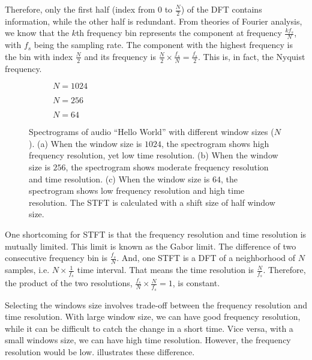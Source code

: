 \documentclass[12pt,final,twoside]{report}
\begin{document}
Therefore, only the first half (index from $0$ to $\frac{N}{2}$) of the DFT contains information, while the other half is redundant. From theories of Fourier analysis, we know that the $k$th frequency bin represents the component at frequency $\frac{kf_s}{N}$, with $f_s$ being the sampling rate. The component with the highest frequency is the bin with index $\frac{N}{2}$ and its frequency is $\frac{N}{2} \times \frac{f_s}{N} = \frac{f_s}{2}$. This is, in fact, the Nyquist frequency.

\begin{figure}[t]
  \centering
  \begin{subfigure}[b]{.8\textwidth}
    \caption{$N=1024$}
    \label{fig:spec1024}
  \end{subfigure}

  \begin{subfigure}[b]{.8\textwidth}
    \caption{$N=256$}
    \label{fig:spec256}
  \end{subfigure}

  \begin{subfigure}[b]{.8\textwidth}
    \caption{$N=64$}
    \label{fig:spec64}
  \end{subfigure}

  \caption[Spectrograms with different window sizes]{Spectrograms of audio ``Hello World'' with different window sizes ($N$). (a) When the window size is $1024$, the spectrogram shows high frequency resolution, yet low time resolution.
(b) When the window size is $256$, the spectrogram shows moderate frequency resolution and time resolution.
(c) When the window size is $64$, the spectrogram shows low frequency resolution and high time resolution.
  The STFT is calculated with a shift size of half window size. }
  \label{fig:spec}
\end{figure}

One shortcoming for STFT is that the frequency resolution and time resolution is mutually limited. This limit is known as the Gabor limit. The difference of two consecutive frequency bin is $\frac{f_s}{N}$. And, one STFT is a DFT of a neighborhood of $N$ samples, i.e. $N \times \frac{1}{f_s}$ time interval. That means the time resolution is $\frac{N}{f_s}$. Therefore, the product of the two resolutions, $\frac{f_s}{N} \times \frac{N}{f_s} = 1$, is constant. 

Selecting the windows size involves trade-off between the frequency resolution and time resolution. With large window size, we can have good frequency resolution, while it can be difficult to catch the change in a short time. Vice versa, with a small windows size, we can have high time resolution. However, the frequency resolution would be low.  illustrates these difference.
\end{document}
